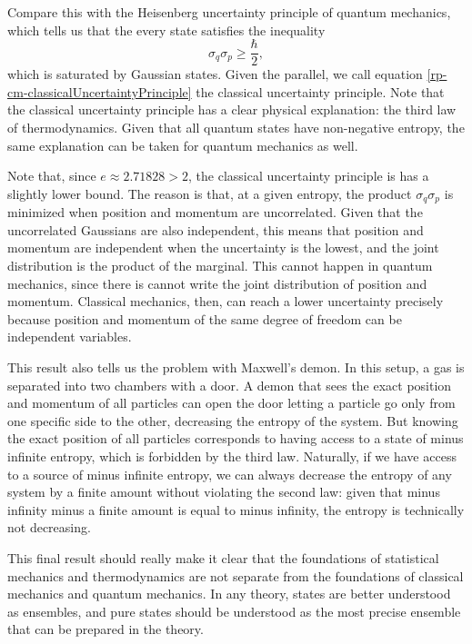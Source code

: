 Compare this with the Heisenberg uncertainty principle of quantum mechanics, which tells us that the every state satisfies the inequality
\begin{equation}
	\sigma_q \sigma_p \geq \frac{\hbar}{2},
\end{equation}
which is saturated by Gaussian states. Given the parallel, we call equation \ref{rp-cm-classicalUncertaintyPrinciple} the classical uncertainty principle. Note that the classical uncertainty principle has a clear physical explanation: the third law of thermodynamics. Given that all quantum states have non-negative entropy, the same explanation can be taken for quantum mechanics as well.

Note that, since $e \approx 2.71828 > 2$, the classical uncertainty principle is has a slightly lower bound. The reason is that, at a given entropy, the product $\sigma_q \sigma_p$ is minimized when position and momentum are uncorrelated. Given that the uncorrelated Gaussians are also independent, this means that position and momentum are independent when the uncertainty is the lowest, and the joint distribution is the product of the marginal. This cannot happen in quantum mechanics, since there is cannot write the joint distribution of position and momentum. Classical mechanics, then, can reach a lower uncertainty precisely because position and momentum of the same degree of freedom can be independent variables.

This result also tells us the problem with Maxwell's demon. In this setup, a gas is separated into two chambers with a door. A demon that sees the exact position and momentum of all particles can open the door letting a particle go only from one specific side to the other, decreasing the entropy of the system. But knowing the exact position of all particles corresponds to having access to a state of minus infinite entropy, which is forbidden by the third law. Naturally, if we have access to a source of minus infinite entropy, we can always decrease the entropy of any system by a finite amount without violating the second law: given that minus infinity minus a finite amount is equal to minus infinity, the entropy is technically not decreasing.

This final result should really make it clear that the foundations of statistical mechanics and thermodynamics are not separate from the foundations of classical mechanics and quantum mechanics. In any theory, states are better understood as ensembles, and pure states should be understood as the most precise ensemble that can be prepared in the theory.

